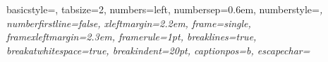 
{
  basicstyle=\ttfamily\footnotesize,
  tabsize=2,
  numbers=left,
  numbersep=0.6em,      %
  numberstyle=\footnotesize\ttfamily\itshape,
  numberfirstline=false,
  xleftmargin=2.2em,    %
  frame=single,      %
  framexleftmargin=2.3em,  %
  framerule=1pt,
  breaklines=true,
  breakatwhitespace=true,
  breakindent=20pt,
  captionpos=b,
  escapechar=~
}

{
  \fancyhf{}  %
  \fancyhead[LE,RO] {\thepage}
  \renewcommand {\headrulewidth}{0pt}
  \renewcommand {\footrulewidth}{0pt}
}